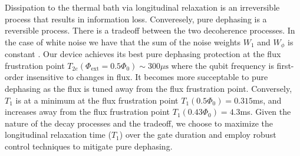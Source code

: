 \documentclass[
  amsfonts,
  amsmath,
  tbtags,
  amssymb,
  aps,
  nobibnotes,
  twocolumn,
]{revtex4-2}
\begin{document}
Dissipation to the thermal bath via longitudinal
relaxation is an irreversible process
that results in information loss.
Converesely, pure dephasing is a reversible process.
There is a tradeoff between the two decoherence processes. In the case of white
noise we have that the sum of the noise weights $W_{1}$ and $W_{\phi}$
is constant \cite{huang2020engineering}.
Our device achieves its best pure dephasing
protection at the flux frustration point
$T_{2e}(\Phi_{\textrm{ext}} = 0.5 \Phi_{0}) \sim 300 \mu\textrm{s}$
where the qubit frequency is first-order insensitive to changes in flux.
It becomes more succeptable to pure dephasing as the flux is tuned away from the flux
frustration point. Conversely, $T_{1}$ is at a minimum
at the flux frustration point $T_{1}(0.5 \Phi_{0}) = 0.315$ms,
and increases away from the flux frustration point
$T_{1}(0.43 \Phi_{0}) = 4.3$ms. Given the nature
of the decay processes and the tradeoff, we choose
to maximize the longitudinal relaxation time ($T_{1}$)
over the gate duration
and employ robust control techniques to mitigate
pure dephasing.
\end{document}
